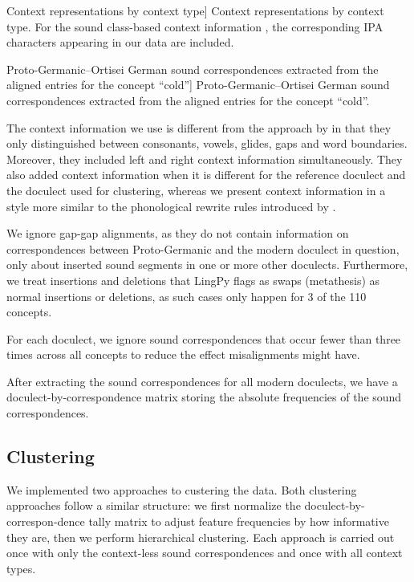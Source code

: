 \documentclass[a4paper]{article}
\begin{document}
\begin{table}[t]

\caption
[Context representations by context type]
{Context representations by context type.
For the sound class-based context information
\citep{list2012sca}, the corresponding IPA characters
appearing in our data are included.}
\label{tab:context}
\end{table}

\begin{table}[b!]

\caption
[Proto-Germanic--Ortisei German sound correspondences
extracted from the aligned entries for the concept ``cold'']
{Proto-Germanic--Ortisei German sound correspondences
extracted from the aligned entries for the concept ``cold''.}
\label{tab:corres}
\end{table}

\FloatBarrier

The context information we use is different from the approach
by \citet{montemagni2013synchronic} in that they only
distinguished between consonants, vowels, glides, gaps and word boundaries.
Moreover, they included left and right context information simultaneously.
They also added context information when it is different for
the reference doculect and the doculect used for clustering,
whereas we present context information in a style more similar to 
the phonological rewrite rules introduced by \citet{chomsky1968sound}.

We ignore gap-gap alignments,
as they do not contain information on correspondences
between Proto-Germanic and the modern doculect in question,
only about inserted sound segments in one or more other doculects.
Furthermore, we treat insertions and deletions
that LingPy flags as swaps (metathesis) as normal insertions or deletions,
as such cases only happen for 3 of the 110 concepts.

For each doculect, we ignore sound correspondences
that occur fewer than three times across all concepts
to reduce the effect misalignments might have. 

After extracting the sound correspondences for
all modern doculects, we have a doculect-by-correspondence
matrix storing the absolute frequencies of the sound correspondences.

\subsection{Clustering}
\label{subsec:clustering}

We implemented two approaches to custering the data.
Both clustering approaches follow a similar structure:
we first normalize the doculect-by-correspon-dence tally matrix
to adjust feature frequencies by how informative they are,
then we perform hierarchical clustering.
Each approach is carried out once with only
the context-less sound correspondences
and once with all context types.
\end{document}
